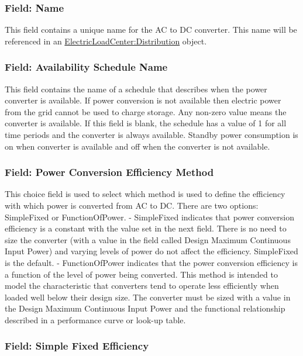 \subsubsection{Field: Name}\label{field-name-5-007}

This field contains a unique name for the AC to DC converter. This name will be referenced in an \hyperref[electricloadcenterdistribution]{ElectricLoadCenter:Distribution} object.

\subsubsection{Field: Availability Schedule Name}\label{field-availability-schedule-name-4-001}

This field contains the name of a schedule that describes when the power converter is available. If power conversion is not available then electric power from the grid cannot be used to charge storage. Any non-zero value means the converter is available. If this field is blank, the schedule has a value of 1 for all time periods and the converter is always available. Standby power consumption is on when converter is available and off when the converter is not available.

\subsubsection{Field: Power Conversion Efficiency Method}\label{field-power-conversion-efficiency-method}

This choice field is used to select which method is used to define the efficiency with which power is converted from AC to DC. There are two options: SimpleFixed or FunctionOfPower. - SimpleFixed indicates that power conversion efficiency is a constant with the value set in the next field. There is no need to size the converter (with a value in the field called Design Maximum Continuous Input Power) and varying levels of power do not affect the efficiency. SimpleFixed is the default. - FunctionOfPower indicates that the power conversion efficiency is a function of the level of power being converted. This method is intended to model the characteristic that converters tend to operate less efficiently when loaded well below their design size. The converter must be sized with a value in the Design Maximum Continuous Input Power and the functional relationship described in a performance curve or look-up table.

\subsubsection{Field: Simple Fixed Efficiency}\label{field-simple-fixed-efficiency}

